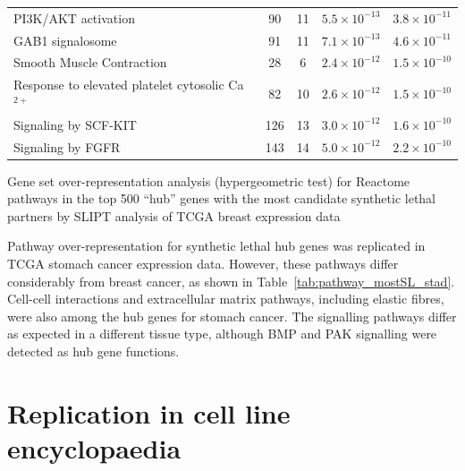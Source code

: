 \begin{table}[!ht]
{\begin{threeparttable}
\begin{tabular}{lcccc}
  \rowcolor{black!10}
  PI3K/AKT activation &  90 &  11 & $5.5 \times 10^{-13}$ & $3.8 \times 10^{-11}$ \\ 
  \rowcolor{black!5}
  GAB1 signalosome &  91 &  11 & $7.1 \times 10^{-13}$ & $4.6 \times 10^{-11}$ \\ 
  \rowcolor{black!10}
  Smooth Muscle Contraction &  28 &   6 & $2.4 \times 10^{-12}$ & $1.5 \times 10^{-10}$ \\ 
  \rowcolor{black!5}
  Response to elevated platelet cytosolic Ca$^{2+}$ &  82 &  10 & $2.6 \times 10^{-12}$ & $1.5 \times 10^{-10}$ \\ 
  \rowcolor{black!10}
  Signaling by SCF-KIT & 126 &  13 & $3.0 \times 10^{-12}$ & $1.6 \times 10^{-10}$ \\ 
  \rowcolor{black!5}
  Signaling by FGFR & 143 &  14 & $5.0 \times 10^{-12}$ & $2.2 \times 10^{-10}$ \\ 
   \hline
\end{tabular}
\begin{tablenotes}
\raggedright \small
Gene set over-representation analysis (hypergeometric test) for Reactome pathways in the top 500 ``hub'' genes with the most candidate synthetic lethal partners by \gls{SLIPT} analysis of TCGA breast expression data
\end{tablenotes}
\end{threeparttable}
}
\end{table}

Pathway over-representation for synthetic lethal hub genes was replicated in TCGA stomach cancer expression data. However, these pathways differ considerably from breast cancer, as shown in Table~\ref{tab:pathway_mostSL_stad}. Cell-cell interactions and extracellular matrix pathways, including elastic fibres, were also among the hub genes for stomach cancer. The signalling pathways differ as expected in a different tissue type, although BMP and PAK signalling were detected as hub gene functions.

\FloatBarrier

\section{Replication in cell line encyclopaedia} \label{chapt3:CCLE}

\FloatBarrier

